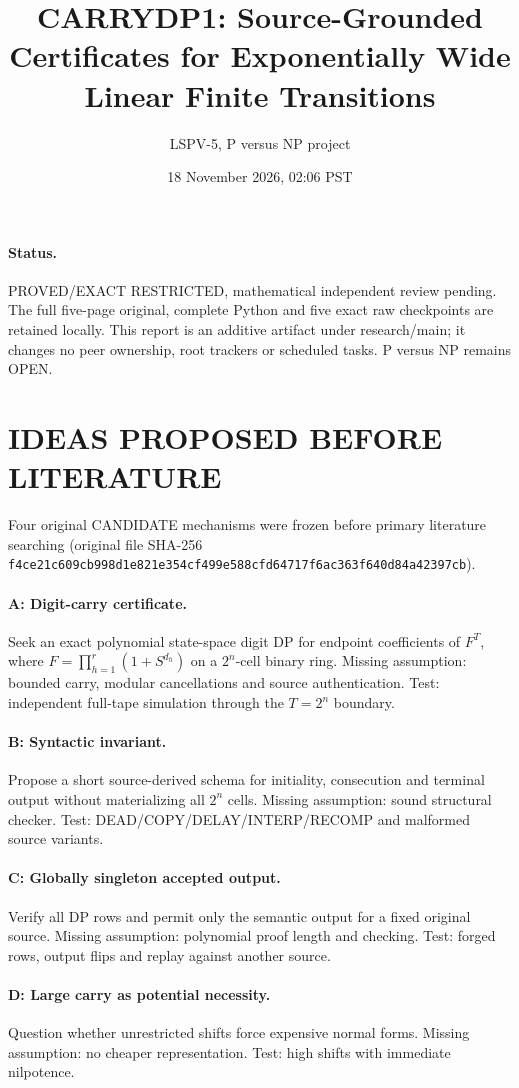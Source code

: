 \documentclass[10pt]{article}
\title{CARRYDP1: Source-Grounded Certificates for Exponentially Wide Linear Finite Transitions}
\author{LSPV-5, P versus NP project}
\date{18 November 2026, 02:06 PST}
\begin{document}
\maketitle
\paragraph{Status.}
PROVED/EXACT RESTRICTED, mathematical independent review pending.
The full five-page original, complete Python and five exact raw checkpoints are
retained locally. This report is an additive artifact under research/main;
it changes no peer ownership, root trackers or scheduled tasks.
P versus NP remains OPEN.

\section{IDEAS PROPOSED BEFORE LITERATURE}
Four original CANDIDATE mechanisms were frozen before primary literature searching
(original file SHA-256
\texttt{f4ce21c609cb998d1e821e354cf499e588cfd64717f6ac363f640d84a42397cb}).
\paragraph{A: Digit-carry certificate.} Seek an exact polynomial state-space
digit DP for endpoint coefficients of $F^T$, where
$F=\prod_{h=1}^r(1+S^{d_h})$ on a $2^n$-cell binary ring.
Missing assumption: bounded carry, modular cancellations and source authentication.
Test: independent full-tape simulation through the $T=2^n$ boundary.
\paragraph{B: Syntactic invariant.} Propose a short source-derived
schema for initiality, consecution and terminal output without
materializing all $2^n$ cells. Missing assumption: sound structural checker.
Test: DEAD/COPY/DELAY/INTERP/RECOMP and malformed source variants.
\paragraph{C: Globally singleton accepted output.} Verify all DP rows
and permit only the semantic output for a fixed original source.
Missing assumption: polynomial proof length and checking.
Test: forged rows, output flips and replay against another source.
\paragraph{D: Large carry as potential necessity.}
Question whether unrestricted shifts force expensive normal forms.
Missing assumption: no cheaper representation.
Test: high shifts with immediate nilpotence.
\end{document}
